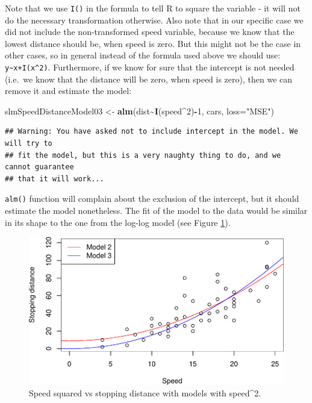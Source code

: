 \documentclass[
]{book}
\newenvironment{Shaded}{\begin{snugshade}}{\end{snugshade}}
\newcommand{\DataTypeTok}[1]{\textcolor[rgb]{0.13,0.29,0.53}{#1}}
\newcommand{\DecValTok}[1]{\textcolor[rgb]{0.00,0.00,0.81}{#1}}
\newcommand{\KeywordTok}[1]{\textcolor[rgb]{0.13,0.29,0.53}{\textbf{#1}}}
\newcommand{\NormalTok}[1]{#1}
\newcommand{\OperatorTok}[1]{\textcolor[rgb]{0.81,0.36,0.00}{\textbf{#1}}}
\newcommand{\StringTok}[1]{\textcolor[rgb]{0.31,0.60,0.02}{#1}}
\theoremstyle{definition}
\theoremstyle{definition}
\theoremstyle{definition}
\theoremstyle{definition}
\theoremstyle{remark}
\begin{document}
Note that we use \texttt{I()} in the formula to tell R to square the variable - it will not do the necessary transformation otherwise. Also note that in our specific case we did not include the non-transformed speed variable, because we know that the lowest distance should be, when speed is zero. But this might not be the case in other cases, so in general instead of the formula used above we should use: \texttt{y\textasciitilde{}x+I(x\^{}2)}. Furthermore, if we know for sure that the intercept is not needed (i.e.~we know that the distance will be zero, when speed is zero), then we can remove it and estimate the model:

\begin{Shaded}
\begin{Highlighting}[]
\NormalTok{slmSpeedDistanceModel03 \textless{}{-}}\StringTok{ }\KeywordTok{alm}\NormalTok{(dist}\OperatorTok{\textasciitilde{}}\KeywordTok{I}\NormalTok{(speed}\OperatorTok{\^{}}\DecValTok{2}\NormalTok{)}\OperatorTok{{-}}\DecValTok{1}\NormalTok{, cars, }\DataTypeTok{loss=}\StringTok{"MSE"}\NormalTok{)}
\end{Highlighting}
\end{Shaded}

\begin{verbatim}
## Warning: You have asked not to include intercept in the model. We will try to
## fit the model, but this is a very naughty thing to do, and we cannot guarantee
## that it will work...
\end{verbatim}

\texttt{alm()} function will complain about the exclusion of the intercept, but it should estimate the model nonetheless. The fit of the model to the data would be similar in its shape to the one from the log-log model (see Figure \ref{fig:speedDistanceSquare02}).

\begin{figure}
\centering
\includegraphics{Svetunkov---Statistics-for-Business-Analytics_files/figure-latex/speedDistanceSquare02-1.pdf}
\caption{\label{fig:speedDistanceSquare02}Speed squared vs stopping distance with models with speed\^{}2.}
\end{figure}
\end{document}
